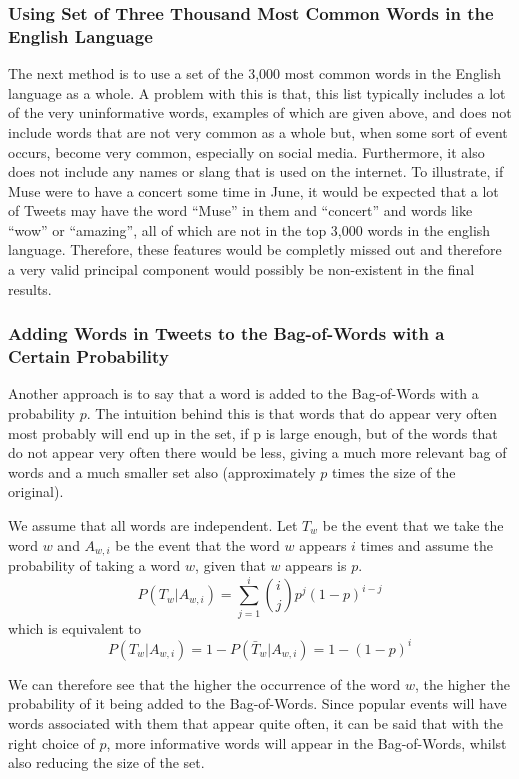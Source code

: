 \documentclass[11pt,a4paper]{article}
\begin{document}
\subsubsection{Using Set of Three Thousand Most Common Words in the English Language}
The next method is to use a set of the 3,000 most common words in the English language as a whole. A problem with this is that, this list typically includes a lot of the very uninformative words, examples of which are given above, and does not include words that are not very common as a whole but, when some sort of event occurs, become very common, especially on social media. Furthermore, it also does not include any names or slang that is used on the internet. To illustrate, if Muse were to have a concert some time in June, it would be expected that a lot of Tweets may have the word ``Muse'' in them and ``concert'' and words like ``wow'' or ``amazing'', all of which are not in the top 3,000 words in the english language. Therefore, these features would be completly missed out and therefore a very valid principal component would possibly be non-existent in the final results.

\subsubsection{Adding Words in Tweets to the Bag-of-Words with a Certain Probability}
Another approach is to say that a word is added to the Bag-of-Words with a probability $p$. The intuition behind this is that words that do appear very often most probably will end up in the set, if p is large enough, but of the words that do not appear very often there would be less, giving a much more relevant bag of words and a much smaller set also (approximately $p$ times the size of the original).

We assume that all words are independent. Let $T_w$ be the event that we take the word $w$ and $A_{w, i}$ be the event that the word $w$ appears $i$ times and assume the probability of taking a word $w$, given that $w$ appears is $p$. 
\begin{equation*}
P\left( T_w | A_{w, i}\right) =  \sum_{j=1}^i {i \choose j} p^j\left( 1 - p\right)^{i-j}
\end{equation*}
which is equivalent to 
\begin{equation}
P\left( T_w | A_{w, i}\right)  = 1 - P(\bar{T}_w |  A_{w, i}) = 1 - (1 - p)^i
\end{equation}

We can therefore see that the higher the occurrence of the word $w$, the higher the probability of it being added to the Bag-of-Words. Since popular events will have words associated with them that appear quite often, it can be said that with the right choice of $p$, more informative words will appear in the Bag-of-Words, whilst also reducing the size of the set. 
\end{document}
